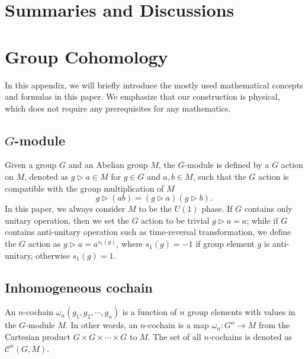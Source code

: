 \documentclass[%
 reprint,
 amsmath,amssymb,
 aps,
prb,
]{revtex4-2}
\begin{document}
\section{Summaries and Discussions}


\appendix

\section{\label{ap:group cohomology}Group Cohomology}

In this appendix, we will briefly introduce the mostly used mathematical concepts and formulas in this paper.
We emphasize that our construction is physical, which does not require any prerequisites for any mathematics.

\subsection{$G$-module}

Given a group $G$ and an Abelian group $M$, the $G$-module is defined by a $G$ action on $M$, denoted as $g\triangleright a\in M$ for $g\in G$ and $a,b\in M$, such that the $G$ action is compatible with the group multiplication of $M$  
\begin{equation}
g\triangleright ( ab) =( g\triangleright a)( g\triangleright b) .\label{eq.ap1.1}
\end{equation}
In this paper, we always consider $M$ to be the $U( 1)$ phase. If $G$ contains only unitary operation, then we set the $G$ action to be trivial $g\triangleright a=a$; while if $G$ contains anti-unitary operation such as time-reversal transformation, we define the $G$ action as $g\triangleright a=a^{s_{1}( g)}$, where $s_{1}( g) =-1$ if group element $g$ is anti-unitary, otherwise $s_{1}( g) =1$.

\subsection{Inhomogeneous cochain}

An $n$-cochain $\omega _{n}( g_{1} ,g_{2} ,\cdots ,g_{n})$ is a function of $n$ group elements with values in the $G$-module $M$. In other words, an $n$-cochain is a map $\omega _{n} :G^{n} \rightarrow M$ from the Cartesian product $G\times G\times \cdots \times G$ to $M$. The set of all $n$-cochains is denoted as $\mathcal{C}^{n}( G,M)$.
\end{document}

